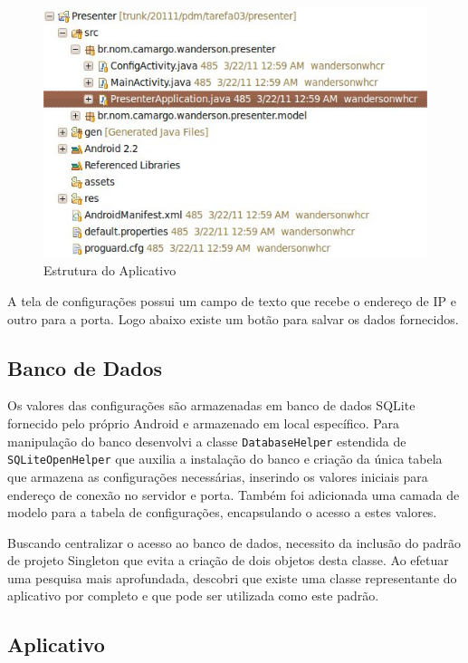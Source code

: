 \documentclass{article}
\begin{document}
\begin{figure}
    \centering{}
    \includegraphics[scale=0.45]{screenshot01-project}
    \caption{Estrutura do Aplicativo}
    \label{fig:project}
\end{figure}

A tela de configurações possui um campo de texto que recebe o endereço de IP e
outro para a porta. Logo abaixo existe um botão para salvar os dados fornecidos.

\subsection{Banco de Dados}

Os valores das configurações são armazenadas em banco de dados SQLite fornecido
pelo próprio Android e armazenado em local específico. Para manipulação do banco
desenvolvi a classe \texttt{DatabaseHelper} estendida de
\texttt{SQLiteOpenHelper} que auxilia a instalação do banco e criação da única
tabela que armazena as configurações necessárias, inserindo os valores iniciais
para endereço de conexão no servidor e porta. Também foi adicionada uma camada
de modelo para a tabela de configurações, encapsulando o acesso a estes valores.

Buscando centralizar o acesso ao banco de dados, necessito da inclusão do padrão
de projeto Singleton que evita a criação de dois objetos desta classe. Ao
efetuar uma pesquisa mais aprofundada, descobri que existe uma classe
representante do aplicativo por completo e que pode ser utilizada como este
padrão.

\subsection{Aplicativo}
\end{document}
